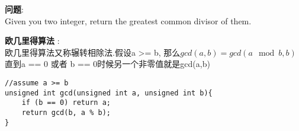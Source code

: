     
\begin{description}
    \item{\textbf{问题}}:\\
Given you two integer, return the greatest common divisor of them.
    \item{\textbf{欧几里得算法}} : 
    \\欧几里得算法又称辗转相除法.假设a >= b, 那么$gcd(a, b) = gcd(a \mod b, b)$直到a == 0 或者 b == 0时候另一个非零值就是gcd(a,b)
    \begin{lstlisting}
//assume a >= b
unsigned int gcd(unsigned int a, unsigned int b){
	if (b == 0) return a;
	return gcd(b, a % b);
}
    \end{lstlisting}
\end{description}
